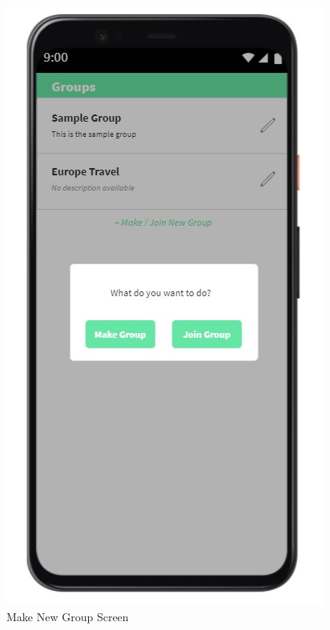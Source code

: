 \documentclass[conference]{IEEEtran}
\begin{document}
\begin{enumerate}
\begin{figure}[H]
                \centerline{\includegraphics[scale=0.5]{img/ui/group-make-or-join.jpg}}
                \caption{Make New Group Screen}
                \label{fig:make-new-group-screen}
            \end{figure}
            \begin{figure}[H]

\end{figure}
\end{enumerate}
\end{document}
